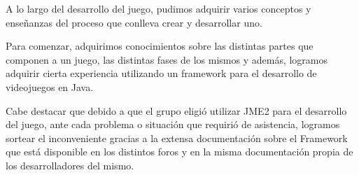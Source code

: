 \documentclass[a4paper,10pt]{article}
\begin{document}
A lo largo del desarrollo del juego, pudimos adquirir varios conceptos y
enseñanzas del proceso que conlleva crear y desarrollar uno.

Para comenzar, adquirimos conocimientos sobre las distintas partes que componen
a un juego, las distintas fases de los mismos y además, logramos adquirir
cierta experiencia utilizando un framework para el desarrollo de videojuegos en
Java.

Cabe destacar que debido a que el grupo eligió utilizar JME2 para el desarrollo
del juego, ante cada problema o situación que requirió de asistencia, logramos
sortear el inconveniente gracias a la extensa documentación sobre el Framework
que está disponible en los distintos foros y en la misma documentación propia
de los desarrolladores del mismo.
\end{document}
